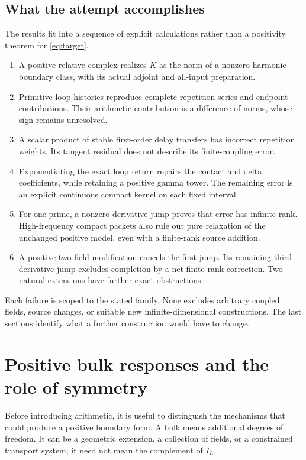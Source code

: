 \documentclass[11pt]{article}
\numberwithin{equation}{section}
\theoremstyle{definition}
\theoremstyle{remark}
\begin{document}
\subsection{What the attempt accomplishes}
The results fit into a sequence of explicit calculations rather than a positivity theorem for \eqref{eq:target}.
\begin{enumerate}
\item A positive relative complex realizes $K$ as the norm of a nonzero harmonic boundary class, with its actual adjoint and all-input preparation.
\item Primitive loop histories reproduce complete repetition series and endpoint contributions. Their arithmetic contribution is a difference of norms, whose sign remains unresolved.
\item A scalar product of stable first-order delay transfers has incorrect repetition weights. Its tangent residual does not describe its finite-coupling error.
\item Exponentiating the exact loop return repairs the contact and delta coefficients, while retaining a positive gamma tower. The remaining error is an explicit continuous compact kernel on each fixed interval.
\item For one prime, a nonzero derivative jump proves that error has infinite rank. High-frequency compact packets also rule out pure relaxation of the unchanged positive model, even with a finite-rank source addition.
\item A positive two-field modification cancels the first jump. Its remaining third-derivative jump excludes completion by a net finite-rank correction. Two natural extensions have further exact obstructions.
\end{enumerate}
Each failure is scoped to the stated family. None excludes arbitrary coupled fields, source changes, or suitable new infinite-dimensional constructions. The last sections identify what a further construction would have to change.

\section{Positive bulk responses and the role of symmetry}
\label{sec:principles}
Before introducing arithmetic, it is useful to distinguish the mechanisms that could produce a positive boundary form. A bulk means additional degrees of freedom. It can be a geometric extension, a collection of fields, or a constrained transport system; it need not mean the complement of $I_L$.
\end{document}
